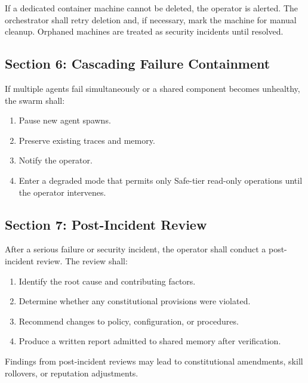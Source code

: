 \documentclass[12pt,letterpaper]{article}
\begin{document}
If a dedicated container machine cannot be deleted, the operator is alerted. The orchestrator shall retry deletion and, if necessary, mark the machine for manual cleanup. Orphaned machines are treated as security incidents until resolved.

\subsection{Section 6: Cascading Failure Containment}

If multiple agents fail simultaneously or a shared component becomes unhealthy, the swarm shall:

\begin{enumerate}
    \item Pause new agent spawns.
    \item Preserve existing traces and memory.
    \item Notify the operator.
    \item Enter a degraded mode that permits only Safe-tier read-only operations until the operator intervenes.
\end{enumerate}

\subsection{Section 7: Post-Incident Review}

After a serious failure or security incident, the operator shall conduct a post-incident review. The review shall:

\begin{enumerate}
    \item Identify the root cause and contributing factors.
    \item Determine whether any constitutional provisions were violated.
    \item Recommend changes to policy, configuration, or procedures.
    \item Produce a written report admitted to shared memory after verification.
\end{enumerate}

Findings from post-incident reviews may lead to constitutional amendments, skill rollovers, or reputation adjustments.

\appendix

\end{document}
